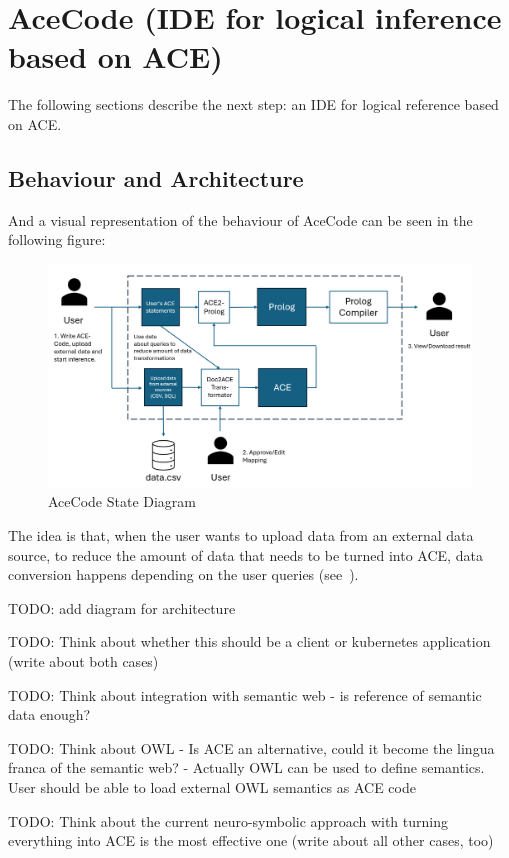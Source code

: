 \documentclass[12pt,a4paper]{article}
\begin{document}
\section{AceCode (IDE for logical inference based on ACE)}

The following sections describe the next step: an IDE for logical reference based on ACE.

\subsection{Behaviour and Architecture}

And a visual representation of the behaviour of AceCode can be seen in the following figure:

\begin{figure}[h]
\includegraphics[width=16cm]{ace_code_state_diagram}
\caption{AceCode State Diagram}
\end{figure}

The idea is that, when the user wants to upload data from an external data source, to reduce the amount of data that needs to be turned into ACE, data conversion happens depending on the user queries (see~\cite{schemaInference}).

TODO: add diagram for architecture

TODO: Think about whether this should be a client or kubernetes application (write about both cases)

TODO: Think about integration with semantic web - is reference of semantic data enough?

TODO: Think about OWL - Is ACE an alternative, could it become the lingua franca of the semantic web? - Actually OWL can be used to define semantics. User should be able to load external OWL semantics as ACE code

TODO: Think about the current neuro-symbolic approach with turning everything into ACE is the most effective one (write about all other cases, too)
\end{document}
